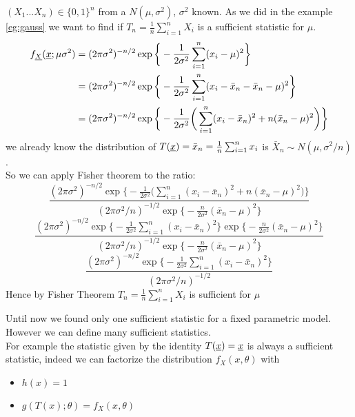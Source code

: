 \begin{eg}$(X_1... X_n)\in \{0,1\}^n$ from a $N(\mu,\sigma^2)$, $\sigma^2$ known. As we did in the example \ref{eg:gauss} we want to find if $T_n=\frac{1}{n}\sum_{i=1}^{n} X_i$ is a sufficient statistic for $\mu$.
	\[
	\begin{split}
	f_{\underline X}(\underline x;\mu\sigma^2)
	&=(2 \pi \sigma^2)^{-n/2} \exp \bigg\{ -\frac{1}{2\sigma^2}\sum_{i=1}^{n} (x_i-\mu)^2 \bigg\}\\
	&=(2 \pi \sigma^2)^{-n/2} \exp \bigg\{ -\frac{1}{2\sigma^2} \sum_{i=1}^{n}(x_i-\bar x_n -\bar x_n -\mu)^2 \bigg\}\\
	&=(2 \pi \sigma^2)^{-n/2} \exp \bigg\{ -\frac{1}{2\sigma^2}\bigg( \sum_{i=1}^{n} (x_i-\bar x_n)^2 + n(\bar x_n-\mu)^2  \bigg) \bigg\}\\
	\end{split}
	\]
	we already know the distribution of $T(\underline x)=\bar x_n=\frac{1}{n}\sum_{i=1}^{n}x_i$ is $\bar X_n\sim N(\mu,\sigma^2/n)$.\\
	So we can apply Fisher theorem to the ratio:
	\[
	\frac{(2 \pi \sigma^2)^{-n/2} \exp \bigg\{ -\frac{1}{2\sigma^2}\bigg( \sum_{i=1}^{n} (x_i-\bar x_n)^2 + n(\bar x_n-\mu)^2  \bigg) \bigg\}}{(2 \pi \sigma^2/n)^{-1/2}\exp \bigg\{- \frac{n}{2\sigma^2} (\bar x_n -\mu)^2 \bigg\}}
	\]
		\[
	\frac{(2 \pi \sigma^2)^{-n/2} \exp \bigg\{ -\frac{1}{2\sigma^2} \sum_{i=1}^{n} (x_i-\bar x_n)^2   \bigg\} \exp \bigg\{ -\frac{n}{2\sigma^2}(\bar x_n-\mu)^2  \bigg\}}{(2 \pi \sigma^2/n)^{-1/2}\exp \bigg\{- \frac{n}{2\sigma^2} (\bar x_n -\mu)^2 \bigg\}}
	\]
	\[
	\frac{(2 \pi \sigma^2)^{-n/2} \exp \bigg\{ -\frac{1}{2\sigma^2} \sum_{i=1}^{n} (x_i-\bar x_n)^2   \bigg\} }{(2 \pi \sigma^2/n)^{-1/2}}
	\]
	Hence by Fisher Theorem $T_n=\frac{1}{n}\sum_{i=1}^{n} X_i$ is sufficient for $\mu$
\end{eg}
\begin{oss}
	Until now we found only one sufficient statistic for a fixed parametric model. However we can define many sufficient statistics.\\
	For example the statistic given by the identity $T(\underline x)=\underline x$ is always a sufficient statistic, indeed we can factorize the distribution $f_X(x,\theta)$ with
	\begin{itemize}
		\item $h(x)=1$
		\item $g(T(x);\theta)=f_X(x,\theta)$
	\end{itemize}
\end{oss}


